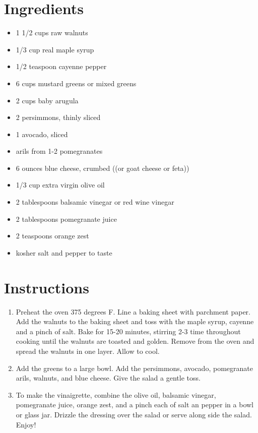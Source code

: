 \documentclass[
  letterpaper,
  DIV=11,
  numbers=noendperiod,
  titlepage=false]{scrreprt}
\providecommand{\tightlist}{%
  \setlength{\itemsep}{0pt}\setlength{\parskip}{0pt}}\usepackage{longtable,booktabs,array}
\begin{document}
\section{Ingredients}\label{ingredients-47}

\begin{itemize}
\tightlist
\item
  1 1/2 cups raw walnuts
\item
  1/3 cup real maple syrup
\item
  1/2 teaspoon cayenne pepper
\item
  6 cups mustard greens or mixed greens
\item
  2 cups baby arugula
\item
  2 persimmons, thinly sliced
\item
  1 avocado, sliced
\item
  arils from 1-2 pomegranates
\item
  6 ounces blue cheese, crumbed ((or goat cheese or feta))
\item
  1/3 cup extra virgin olive oil
\item
  2 tablespoons balsamic vinegar or red wine vinegar
\item
  2 tablespoons pomegranate juice
\item
  2 teaspoons orange zest
\item
  kosher salt and pepper to taste
\end{itemize}

\section{Instructions}\label{instructions-47}

\begin{enumerate}
\def\labelenumi{\arabic{enumi}.}
\tightlist
\item
  Preheat the oven 375 degrees F. Line a baking sheet with parchment
  paper. Add the walnuts to the baking sheet and toss with the maple
  syrup, cayenne and a pinch of salt. Bake for 15-20 minutes, stirring
  2-3 time throughout cooking until the walnuts are toasted and golden.
  Remove from the oven and spread the walnuts in one layer. Allow to
  cool.
\item
  Add the greens to a large bowl. Add the persimmons, avocado,
  pomegranate arils, walnuts, and blue cheese. Give the salad a gentle
  toss.
\item
  To make the vinaigrette, combine the olive oil, balsamic vinegar,
  pomegranate juice, orange zest, and a pinch each of salt an pepper in
  a bowl or glass jar. Drizzle the dressing over the salad or serve
  along side the salad. Enjoy!
\end{enumerate}
\end{document}
